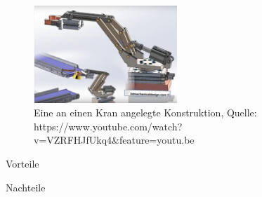 \paragraph{}
\begin{figure}[h!]
        \centering
        \includegraphics[width=0.48\textwidth]{img/technologierecherche/Rotation/kran.jpg}
        \caption{Eine an einen Kran angelegte Konstruktion, Quelle: https://www.youtube.com/watch?v=VZRFHJfUkq4\&feature=youtu.be} 
        \label{img:tech_kran}
\end{figure}
\begin{minipage}[t]{0.48\textwidth}
    \begin{items}
          \item [Vorteile]
          \item 
          \item 
    \end{items}
\end{minipage}
\hfill
\begin{minipage}[t]{0.48\textwidth}
    \begin{items}
          \item [Nachteile]
          \item 
          \item
          \item 
          \item 
    \end{items}
\end{minipage}
